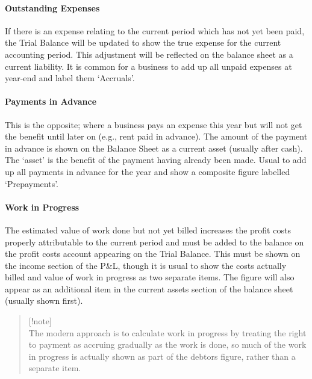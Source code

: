 \documentclass[
]{article}
\begin{document}
\hypertarget{outstanding-expenses}{%
\paragraph{Outstanding Expenses}\label{outstanding-expenses}}

If there is an expense relating to the current period which has not yet
been paid, the Trial Balance will be updated to show the true expense
for the current accounting period. This adjustment will be reflected on
the balance sheet as a current liability. It is common for a business to
add up all unpaid expenses at year-end and label them `Accruals'.

\hypertarget{payments-in-advance}{%
\paragraph{Payments in Advance}\label{payments-in-advance}}

This is the opposite; where a business pays an expense this year but
will not get the benefit until later on (e.g., rent paid in advance).
The amount of the payment in advance is shown on the Balance Sheet as a
current asset (usually after cash). The `asset' is the benefit of the
payment having already been made. Usual to add up all payments in
advance for the year and show a composite figure labelled `Prepayments'.

\hypertarget{work-in-progress}{%
\paragraph{Work in Progress}\label{work-in-progress}}

The estimated value of work done but not yet billed increases the profit
costs properly attributable to the current period and must be added to
the balance on the profit costs account appearing on the Trial Balance.
This must be shown on the income section of the P\&L, though it is usual
to show the costs actually billed and value of work in progress as two
separate items. The figure will also appear as an additional item in the
current assets section of the balance sheet (usually shown first).

\begin{quote}
{[}!note{]}\\
The modern approach is to calculate work in progress by treating the
right to payment as accruing gradually as the work is done, so much of
the work in progress is actually shown as part of the debtors figure,
rather than a separate item.
\end{quote}
\end{document}
